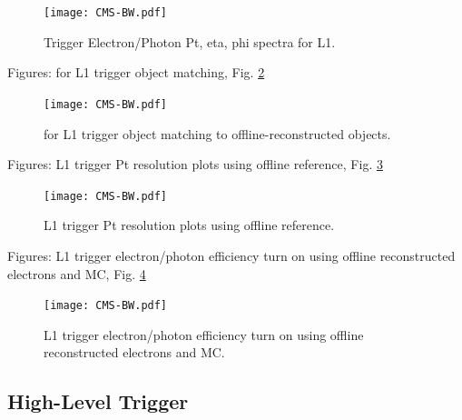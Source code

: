  \begin{figure}[htb]
  \begin{center}
    \texttt{[image: CMS-BW.pdf]}
  \end{center}
  \caption[Trigger Electron/Photon Pt, eta, phi spectra for L1]{Trigger Electron/Photon Pt, eta, phi spectra for L1.}
  \label{fig:L1TriggerObjectSpectra}
 \end{figure}


Figures: \DR for L1 trigger object matching, Fig. \ref{fig:L1TriggerObjectDeltaR}

 \begin{figure}[htb]
  \begin{center}
    \texttt{[image: CMS-BW.pdf]}
  \end{center}
  \caption[\DR for L1 trigger object matching to offline]{\DR for L1 trigger object matching to offline-reconstructed objects.}
  \label{fig:L1TriggerObjectDeltaR}
 \end{figure}

Figures: L1 trigger Pt resolution plots using offline reference, Fig. \ref{fig:L1TriggerObjectResolutions}

 \begin{figure}[htb]
  \begin{center}
    \texttt{[image: CMS-BW.pdf]}
  \end{center}
  \caption[L1 trigger Pt resolution plots using offline reference]{L1 trigger Pt resolution plots using offline reference.}
  \label{fig:L1TriggerObjectResolutions}
 \end{figure}

Figures: L1 trigger electron/photon efficiency turn on using offline reconstructed electrons and MC, Fig. \ref{fig:L1TriggerObjectEfficiencies}

 \begin{figure}[htb]
  \begin{center}
    \texttt{[image: CMS-BW.pdf]}
  \end{center}
  \caption[L1 trigger electron/photon efficiency turn on using offline reconstructed electrons and MC]{L1 trigger electron/photon efficiency turn on using offline reconstructed electrons and MC.}
  \label{fig:L1TriggerObjectEfficiencies}
 \end{figure}


\subsection{High-Level Trigger}


